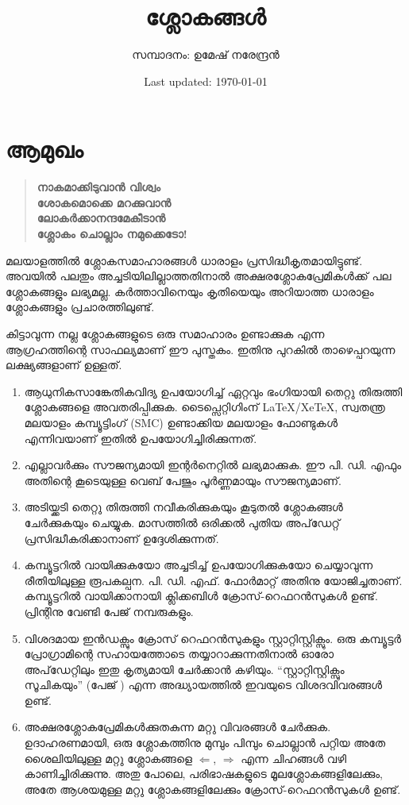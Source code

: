 \documentclass{article}
\title{ശ്ലോകങ്ങള്‍}
\author{{\small സമ്പാദനം:} ഉമേഷ് നരേന്ദ്രന്‍}
\date{Last updated: \today}
\begin{document}
\maketitle

\clearpage

\section*{ആമുഖം}

\begin{verse}
    \bfseries
    \color{teal}
    \small
നാകമാക്കിടുവാൻ വിശ്വം \\
ശോകമൊക്കെ മറക്കുവാൻ \\
ലോകർക്കാനന്ദമേകീടാൻ \\
ശ്ലോകം ചൊല്ലാം നമുക്കെടോ!
\end{verse}


മലയാളത്തില്‍ ശ്ലോകസമാഹാരങ്ങള്‍ ധാരാളം പ്രസിദ്ധീകൃതമായിട്ടുണ്ട്. അവയിൽ പലതും
അച്ചടിയിലില്ലാത്തതിനാല്‍ അക്ഷരശ്ലോകപ്രേമികൾക്ക് പല ശ്ലോകങ്ങളും ലഭ്യമല്ല.  കർത്താവിനെയും കൃതിയെയും അറിയാത്ത ധാരാളം ശ്ലോകങ്ങളും പ്രചാരത്തിലുണ്ട്.  

കിട്ടാവുന്ന നല്ല ശ്ലോകങ്ങളുടെ ഒരു സമാഹാരം ഉണ്ടാക്കുക എന്ന ആഗ്രഹത്തിന്റെ സാഫല്യമാണ് ഈ
പുസ്തകം.  ഇതിനു പുറകില്‍ താഴെപ്പറയുന്ന ലക്ഷ്യങ്ങളാണ് ഉള്ളത്.

\begin{enumerate}
\item ആധുനികസാങ്കേതികവിദ്യ ഉപയോഗിച്ച് ഏറ്റവും ഭംഗിയായി തെറ്റു തിരുത്തി ശ്ലോകങ്ങളെ
  അവതരിപ്പിക്കുക. ടൈപ്സെറ്റിഗിംന് \LaTeX/XeTeX{}, സ്വതന്ത്ര മലയാളം കമ്പ്യൂട്ടിംഗ്
  (SMC) ഉണ്ടാക്കിയ മലയാളം ഫോണ്ടുകള്‍ എന്നിവയാണ്  ഇതില്‍
  ഉപയോഗിച്ചിരിക്കുന്നത്. 
\item എല്ലാവര്‍ക്കും സൗജന്യമായി ഇന്റര്‍നെറ്റില്‍ ലഭ്യമാക്കുക.  ഈ പി. ഡി. എഫും അതിന്റെ
  കൂടെയുള്ള വെബ് പേജും പൂര്‍ണ്ണമായും സൗജന്യമാണ്.
\item അടിയ്ക്കടി തെറ്റു തിരുത്തി നവീകരിക്കുകയും കൂടുതല്‍ ശ്ലോകങ്ങള്‍ ചേര്‍ക്കുകയും ചെയ്യുക.
  മാസത്തില്‍ ഒരിക്കല്‍ പുതിയ അപ്‌ഡേറ്റ് പ്രസിദ്ധീകരിക്കാനാണ് ഉദ്ദേശിക്കുന്നത്.
\item കമ്പ്യൂട്ടറില്‍ വായിക്കുകയോ അച്ചടിച്ച് ഉപയോഗിക്കുകയോ ചെയ്യാവുന്ന രീതിയിലുള്ള
  രൂപകല്പന.  പി. ഡി. എഫ്. ഫോര്‍മാറ്റ് അതിനു യോജിച്ചതാണ്.  കമ്പ്യൂട്ടറില്‍ വായിക്കാനായി
  ക്ലിക്കബിള്‍ ക്രോസ്-റെഫറന്‍സുകള്‍ ഉണ്ട്.  പ്രിന്റിനു വേണ്ടി പേജ് നമ്പരുകളും. 
\item വിശദമായ ഇന്‍ഡക്സും ക്രോസ് റെഫറന്‍സുകളും സ്റ്റാറ്റിസ്റ്റിക്സും.  ഒരു കമ്പ്യൂട്ടര്‍ പ്രോഗ്രാമിന്റെ
  സഹായത്തോടെ തയ്യാറാക്കുന്നതിനാല്‍ ഓരോ അപ്‌ഡേറ്റിലും ഇതു കൃത്യമായി ചേര്‍ക്കാന്‍
  കഴിയും. ``സ്റ്റാറ്റിസ്റ്റിക്സും സൂചികയും'' (പേജ് \pageref{sec:Statistics}) എന്ന
  അദ്ധ്യായത്തില്‍ ഇവയുടെ വിശദവിവരങ്ങള്‍ ഉണ്ട്. 
\item അക്ഷരശ്ലോകപ്രേമികള്‍ക്കുതകുന്ന മറ്റു വിവരങ്ങള്‍ ചേര്‍ക്കുക.  ഉദാഹരണമായി, ഒരു
  ശ്ലോകത്തിനു മുമ്പും പിമ്പും ചൊല്ലാന്‍ പറ്റിയ അതേ ശൈലിയിലുള്ള മറ്റു ശ്ലോകങ്ങളെ
  $\Leftarrow$, $\Rightarrow$ എന്ന ചിഹങ്ങള്‍ വഴി കാണിച്ചിരിക്കുന്നു.  അതു പോലെ,
  പരിഭാഷകളുടെ മൂലശ്ലോകങ്ങളിലേക്കും, അതേ ആശയമുള്ള മറ്റു ശ്ലോകങ്ങളിലേക്കും
  ക്രോസ്-റെഫറന്‍സുകള്‍ ഉണ്ട്. 
\end{enumerate}
\end{document}
